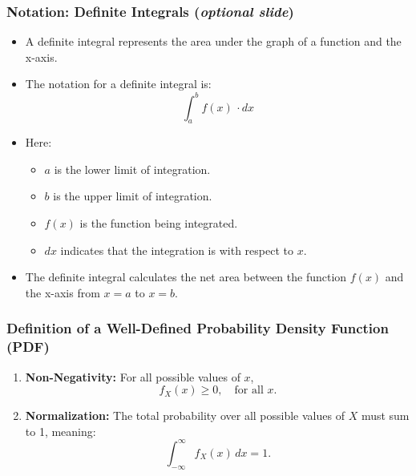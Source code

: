 \documentclass[handout]{beamer} %
\begin{document}
\begin{frame}
\frametitle{Notation: Definite Integrals (\emph{optional slide})}
    \begin{itemize}
        \item A definite integral represents the area under the graph of a function and the x-axis. \pause
        \item The notation for a definite integral is:
        \[
        \int_{a}^{b} f(x) \, \cdot dx
        \] \pause \vspace{-1.5em}
        \item Here:
        \begin{itemize}
            \item \(a\) is the lower limit of integration.
            \item \(b\) is the upper limit of integration.
            \item \(f(x)\) is the function being integrated.
            \item \(dx\) indicates that the integration is with respect to \(x\).
        \end{itemize} \pause
        \item The definite integral calculates the net area between the function \(f(x)\) and the x-axis from \(x = a\) to \(x = b\).
    \end{itemize}
\end{frame}

\begin{frame}
\frametitle{Definition of a Well-Defined Probability Density Function (PDF)}
\vspace{0.5em}


\begin{enumerate}
    \item \textbf{Non-Negativity:} For all possible values of $x$,
    \[
    f_X(x) \geq 0, \quad \text{for all } x.
    \]
    \pause
    \item \textbf{Normalization:} The total probability over all possible values of $X$ must sum to 1, meaning:
    \[
    \int_{-\infty}^{\infty} f_X(x) \,dx = 1.
    \]
\end{enumerate}


\end{frame}
\end{document}
